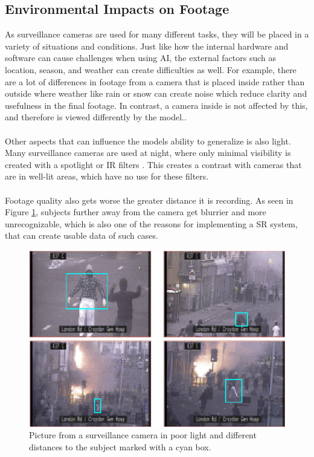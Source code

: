 \subsection{Environmental Impacts on Footage}
As surveillance cameras are used for many different tasks, they will be placed in a variety of situations and conditions. Just like how the internal hardware and software can cause challenges when using \acs{AI}, the external factors such as location, season, and weather can create difficulties as well. For example, there are a lot of differences in footage from a camera that is placed inside rather than outside where weather like rain or snow can create noise which reduce clarity and usefulness in the final footage. In contrast, a camera inside is not affected by this, and therefore is viewed differently by the model.\cite{arxiv_suerres2021}. 
\\\\
Other aspects that can influence the models ability to generalize is also light. Many surveillance cameras are used at night, where only minimal visibility is created with a spotlight or \acf{IR} filters \cite{nightvision_enhancement2018}. This creates a contrast with cameras that are in well-lit areas, which have no use for these filters.
\\\\
Footage quality also gets worse the greater distance it is recording. As seen in Figure \ref{fig:camera_distance}, subjects further away from the camera get blurrier and more unrecognizable, which is also one of the reasons for implementing a \acf{SR} system, that can create usable data of such cases. 
\begin{figure}[H]
    \centering
    \includegraphics[width=0.7\linewidth]{Typical-images-from-a-single-CCTV-camera-with-poor-lighting-and-long-range-camera-views.png}
    \caption{Picture from a surveillance camera in poor light and different distances to the subject marked with a cyan box.}
    \label{fig:camera_distance}
\end{figure}

